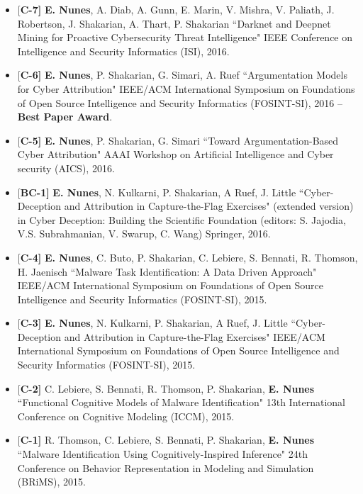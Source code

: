 \documentclass[margin,line]{CV}
\begin{document}
\begin{resume}
\begin{itemize}[leftmargin =*]
\item {[\bf C-7]} {\bf E. Nunes}, A. Diab, A. Gunn, E. Marin, V. Mishra, V. Paliath, J. Robertson, J. Shakarian, A. Thart, P. Shakarian ``Darknet and Deepnet Mining for Proactive Cybersecurity Threat Intelligence" IEEE Conference on Intelligence and Security Informatics (ISI), 2016.

\item {[\bf C-6]} {\bf E. Nunes}, P. Shakarian, G. Simari, A. Ruef  ``Argumentation Models for Cyber Attribution"
IEEE/ACM International Symposium on Foundations of Open Source Intelligence and Security Informatics (FOSINT-SI), 2016 -- {\bf Best Paper Award}.

\item {[\bf C-5]} {\bf E. Nunes}, P. Shakarian, G. Simari ``Toward Argumentation-Based Cyber Attribution"
AAAI Workshop on Artificial Intelligence and Cyber security (AICS), 2016.

\item {[\bf BC-1]} {\bf E. Nunes}, N. Kulkarni, P. Shakarian, A Ruef, J. Little ``Cyber-Deception and Attribution in Capture-the-Flag Exercises" (extended version) in Cyber Deception: Building the Scientific Foundation (editors: S. Jajodia, V.S. Subrahmanian, V. Swarup, C. Wang) Springer, 2016.

\item {[\bf C-4]} {\bf E. Nunes}, C. Buto, P. Shakarian, C. Lebiere, S. Bennati, R. Thomson, H. Jaenisch ``Malware Task Identification: A Data Driven Approach"  IEEE/ACM International Symposium on Foundations of Open Source Intelligence and Security Informatics (FOSINT-SI), 2015.

\item {[\bf C-3]} {\bf E. Nunes},  N. Kulkarni, P. Shakarian, A Ruef, J. Little ``Cyber-Deception and Attribution in Capture-the-Flag Exercises"  IEEE/ACM International Symposium on Foundations of Open Source Intelligence and Security Informatics (FOSINT-SI), 2015.

\item {[\bf C-2]} C. Lebiere, S. Bennati, R. Thomson, P. Shakarian, {\bf E. Nunes}  ``Functional Cognitive Models of Malware Identification" 13th International Conference on Cognitive Modeling (ICCM), 2015.

\item {[\bf C-1]} R. Thomson, C. Lebiere, S. Bennati, P. Shakarian, {\bf E. Nunes}   ``Malware Identification Using Cognitively-Inspired Inference" 24th Conference on Behavior Representation in Modeling and Simulation (BRiMS), 2015.
   

\end{itemize}
\end{resume}
\end{document}
